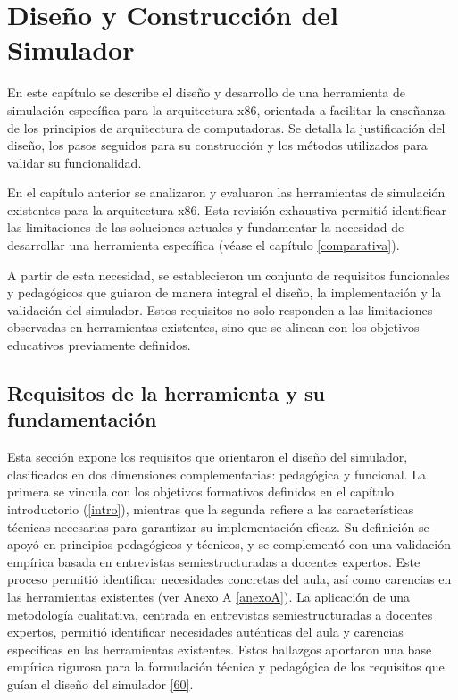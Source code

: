 \documentclass[12pt,oneside]{templates/unerthesis}
\begin{document}
\hypertarget{desarrollo}{%
\chapter{Diseño y Construcción del Simulador}\label{desarrollo}}

En este capítulo se describe el diseño y desarrollo de una herramienta de simulación específica para la arquitectura x86, orientada a facilitar la enseñanza de los principios de arquitectura de computadoras. Se detalla la justificación del diseño, los pasos seguidos para su construcción y los métodos utilizados para validar su funcionalidad.

En el capítulo anterior se analizaron y evaluaron las herramientas de simulación existentes para la arquitectura x86. Esta revisión exhaustiva permitió identificar las limitaciones de las soluciones actuales y fundamentar la necesidad de desarrollar una herramienta específica (véase el capítulo \ref{comparativa}).

A partir de esta necesidad, se establecieron un conjunto de requisitos funcionales y pedagógicos que guiaron de manera integral el diseño, la implementación y la validación del simulador. Estos requisitos no solo responden a las limitaciones observadas en herramientas existentes, sino que se alinean con los objetivos educativos previamente definidos.

\hypertarget{requisitos-de-la-herramienta-y-su-fundamentaciuxf3n}{%
\section{Requisitos de la herramienta y su fundamentación}\label{requisitos-de-la-herramienta-y-su-fundamentaciuxf3n}}

Esta sección expone los requisitos que orientaron el diseño del simulador, clasificados en dos dimensiones complementarias: pedagógica y funcional. La primera se vincula con los objetivos formativos definidos en el capítulo introductorio (\ref{intro}), mientras que la segunda refiere a las características técnicas necesarias para garantizar su implementación eficaz. Su definición se apoyó en principios pedagógicos y técnicos, y se complementó con una validación empírica basada en entrevistas semiestructuradas a docentes expertos. Este proceso permitió identificar necesidades concretas del aula, así como carencias en las herramientas existentes (ver Anexo A \ref{anexoA}). La aplicación de una metodología cualitativa, centrada en entrevistas semiestructuradas a docentes expertos, permitió identificar necesidades auténticas del aula y carencias específicas en las herramientas existentes. Estos hallazgos aportaron una base empírica rigurosa para la formulación técnica y pedagógica de los requisitos que guían el diseño del simulador \protect\hyperlink{ref-huberman2019qualitative}{{[}60{]}}.
\end{document}
